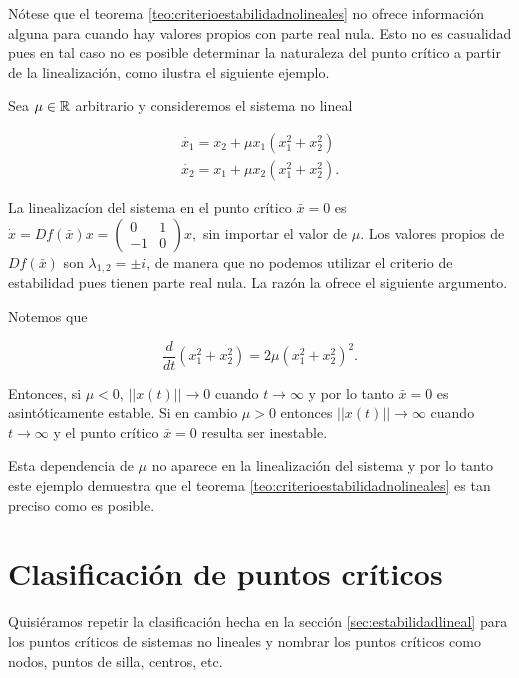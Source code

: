 \begin{example}
\end{example}

Nótese que el teorema \ref{teo:criterioestabilidadnolineales} no ofrece información alguna para cuando hay valores propios con parte real nula. Esto no es casualidad pues en tal caso no es posible determinar la naturaleza del punto crítico a partir de la linealización, como ilustra el siguiente ejemplo.

\begin{example} \label{ex:nolinealnohiperbolico}
Sea $\mu \in {\ensuremath{\mathbb{R}}}$ arbitrario y consideremos el sistema no lineal

$$
	\begin{array}{l}
		\dot{x_1} = x_2 + \mu x_1(x_1^2 + x_2^2) \\
		\dot{x_2} = x_1 + \mu x_2(x_1^2 + x_2^2).
	\end{array}
$$

La linealizacíon del sistema en el punto crítico $\bar{x} = 0$ es $\dot{x} = Df(\bar{x})x = \left( \begin{array}{ll} 0 & 1 \\ -1 & 0 \end{array} \right) x,$ sin importar el valor de $\mu$.
Los valores propios de $Df(\bar{x})$ son $\lambda_{1,2} = \pm i$, de manera que no podemos utilizar el criterio de estabilidad pues tienen parte real nula. La razón la ofrece el siguiente argumento.

Notemos que

$$ \dfrac{d}{dt} (x_1^2 + x_2^2) = 2\mu(x_1^2 + x_2^2)^2. $$

Entonces, si $\mu < 0$, $||x(t)|| \to 0$ cuando $t \to \infty$ y por lo tanto $\bar{x} = 0$ es asintóticamente estable.
Si en cambio $\mu > 0$ entonces $||x(t)|| \to \infty$ cuando $t \to \infty$ y el punto crítico $\bar{x} = 0$ resulta ser inestable.

Esta dependencia de $\mu$ no aparece en la linealización del sistema y por lo tanto este ejemplo demuestra que el teorema \ref{teo:criterioestabilidadnolineales} es tan preciso como es posible.
\end{example}


\section{Clasificación de puntos críticos}

Quisiéramos repetir la clasificación hecha en la sección \ref{sec:estabilidadlineal} para los puntos críticos de sistemas no lineales y nombrar los puntos críticos como nodos, puntos de silla, centros, etc.

